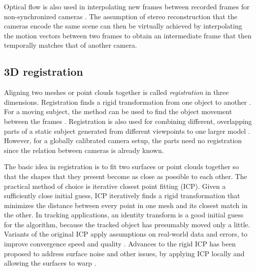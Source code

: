 Optical flow is also used in interpolating new frames between recorded frames for non-synchronized cameras \cite{bradley2009synchronization}.
The assumption of stereo reconstruction that the cameras encode the same scene can then be virtually achieved by interpolating the motion vectors between two frames to obtain an intermediate frame that then temporally matches that of another camera.


\subsection{3D registration} %

Aligning two meshes or point clouds together is called \emph{registration} in three dimensions.
Registration finds a rigid transformation from one object to another \cite{zhang1994iterative,rusinkiewicz2001efficient}.
For a moving subject, the method can be used to find the object movement between the frames \cite{pons2005modelling,zhao2005alignment}.
Registration is also used for combining different, overlapping parts of a static subject generated from different viewpoints to one larger model \cite{eggert1998simultaneous,huber2003fully}.
However, for a globally calibrated camera setup, the parts need no registration since the relation between cameras is already known.

The basic idea in registration is to fit two surfaces or point clouds together so that the shapes that they present become as close as possible to each other.
The practical method of choice is iterative closest point fitting (ICP).
Given a sufficiently close initial guess, ICP iteratively finds a rigid transformation that minimizes the distance between every point in one mesh and its closest match in the other.
In tracking applications, an identity transform is a good initial guess for the algorithm, because the tracked object has presumably moved only a little.
Variants of the original ICP apply assumptions on real-world data and errors, to improve convergence speed and quality \cite{zhang1994iterative,rusinkiewicz2001efficient}.
Advances to the rigid ICP has been proposed to address surface noise and other issues, by applying ICP locally and allowing the surfaces to warp \cite{brown2007global}.


